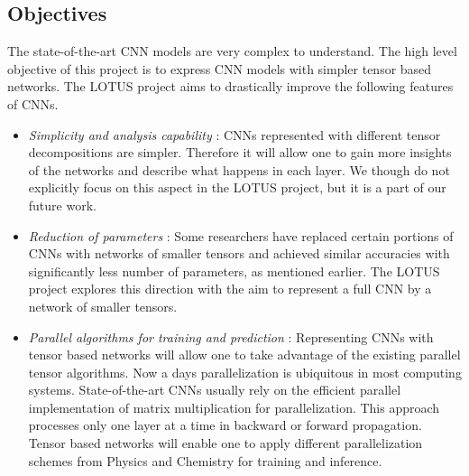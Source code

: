 \documentclass[11pt]{article}
\newcommand{\prname}{LOTUS\xspace}
\begin{document}
\subsection{Objectives}
The state-of-the-art CNN models are very complex to understand. The high level objective of this project is to express CNN models with simpler tensor based networks.  The \prname project aims to drastically improve the following features of CNNs.
\begin{itemize}
	\item \emph{Simplicity and analysis capability} :  CNNs represented with different tensor decompositions are simpler. Therefore it will allow one to gain more insights of the networks and describe what happens in each layer. We though do not explicitly focus on this aspect in the \prname project, but it is a part of our future work.
	\item \emph{Reduction of parameters} : Some researchers have replaced certain portions of CNNs with  networks of smaller tensors and achieved  similar accuracies with significantly less number of parameters, as mentioned earlier. The \prname project explores this direction with the aim to represent a full CNN by a network of smaller tensors. 
	\item \emph{Parallel algorithms for training and prediction} : Representing CNNs with tensor based networks will allow one to take advantage of the existing parallel tensor algorithms. Now a days parallelization is ubiquitous in most computing systems. State-of-the-art CNNs usually rely on the efficient parallel implementation of matrix multiplication for parallelization. This approach processes only one layer at a time in backward or forward propagation. Tensor based networks will enable one to apply different parallelization schemes from Physics and Chemistry for training and inference.
\end{itemize}
\end{document}
